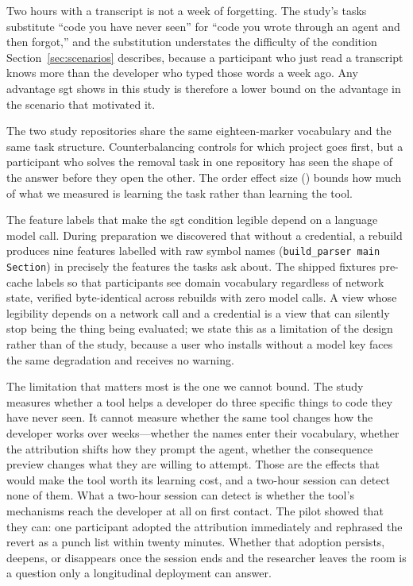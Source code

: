 Two hours with a transcript is not a week of forgetting. The study's tasks
substitute ``code you have never seen'' for ``code you wrote through an agent
and then forgot,'' and the substitution understates the difficulty of the
condition Section~\ref{sec:scenarios} describes, because a participant who just
read a transcript knows more than the developer who typed those words a week
ago. Any advantage sgt shows in this study is therefore a lower bound on the
advantage in the scenario that motivated it.

The two study repositories share the same eighteen-marker vocabulary and the
same task structure. Counterbalancing controls for which project goes first, but
a participant who solves the removal task in one repository has seen the shape
of the answer before they open the other. The order effect size
() bounds how much of what we measured is learning the task
rather than learning the tool.

The feature labels that make the sgt condition legible depend on a language model
call. During preparation we discovered that without a credential, a rebuild
produces nine features labelled with raw symbol names (\texttt{build\_parser main
Section}) in precisely the features the tasks ask about. The shipped fixtures
pre-cache labels so that participants see domain vocabulary regardless of network
state, verified byte-identical across rebuilds with zero model calls. A view
whose legibility depends on a network call and a credential is a view that can
silently stop being the thing being evaluated; we state this as a limitation of
the design rather than of the study, because a user who installs \sgt{} without
a model key faces the same degradation and receives no warning.

The limitation that matters most is the one we cannot bound. The study measures
whether a tool helps a developer do three specific things to code they have never
seen. It cannot measure whether the same tool changes how the developer works
over weeks---whether the names enter their vocabulary, whether the attribution
shifts how they prompt the agent, whether the consequence preview changes what
they are willing to attempt. Those are the effects that would make the tool
worth its learning cost, and a two-hour session can detect none of them. What a
two-hour session can detect is whether the tool's mechanisms reach the developer
at all on first contact. The pilot showed that they can: one participant adopted
the attribution immediately and rephrased the revert as a punch list within
twenty minutes. Whether that adoption persists, deepens, or disappears once
the session ends and the researcher leaves the room is a question only a
longitudinal deployment can answer.
